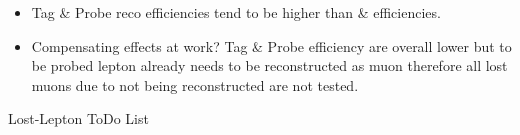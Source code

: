 \documentclass{beamer}
\begin{document}
\begin{frame}
\begin{columns}
\begin{column}{0.33\textwidth}
   \end{column}
  \end{columns}
\begin{itemize}
 \item Tag \& Probe reco efficiencies tend to be higher than \ttbar \& \wpj efficiencies.
 \item Compensating effects at work? Tag \& Probe efficiency are overall lower but to be probed lepton already needs to be reconstructed as muon therefore all lost muons due to not being reconstructed are not tested.

\end{itemize}

\end{frame}


\begin{frame}
 \begin{block}{}
 \centering
 \Large Lost-Lepton ToDo List
 \end{block}


\end{frame}
\end{document}
